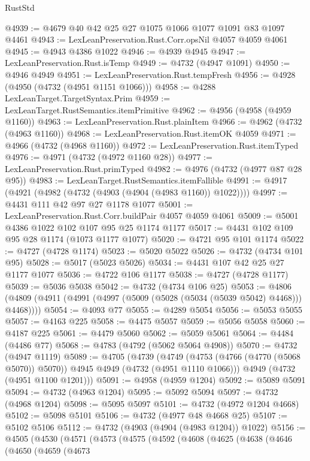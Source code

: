 \begin{lexlean}{RustStd}
\begin{coremodule}
@4939 := @4679 @40 @42 @25 @27 @1075 @1066 @1077 @1091 @83 @1097 @4461
@4943 := LexLeanPreservation.Rust.Corr.opsNil @4057 @4059 @4061
@4945 := @4943 @4386 @1022
@4946 := @4939 @4945
@4947 := LexLeanPreservation.Rust.isTemp
@4949 := @4732 (@4947 @1091)
@4950 := @4946 @4949
@4951 := LexLeanPreservation.Rust.tempFresh
@4956 := @4928 (@4950 (@4732 (@4951 @1151 @1066)))
@4958 := @4288 LexLeanTarget.TargetSyntax.Prim
@4959 := LexLeanTarget.RustSemantics.itemPrimitive
@4962 := @4956 (@4958 (@4959 @1160))
@4963 := LexLeanPreservation.Rust.plainItem
@4966 := @4962 (@4732 (@4963 @1160))
@4968 := LexLeanPreservation.Rust.itemOK @4059
@4971 := @4966 (@4732 (@4968 @1160))
@4972 := LexLeanPreservation.Rust.itemTyped
@4976 := @4971 (@4732 (@4972 @1160 @28))
@4977 := LexLeanPreservation.Rust.primTyped
@4982 := @4976 (@4732 (@4977 @87 @28 @95))
@4983 := LexLeanTarget.RustSemantics.itemFallible
@4991 := @4917 (@4921 (@4982 (@4732 (@4903 (@4904 (@4983 @1160)) @1022))))
@4997 := @4431 @111 @42 @97 @27 @1178 @1077
@5001 := LexLeanPreservation.Rust.Corr.buildPair @4057 @4059 @4061
@5009 := @5001 @4386 @1022 @102 @107 @95 @25 @1174 @1177
@5017 := @4431 @102 @109 @95 @28 @1174 (@1073 @1177 @1077)
@5020 := @4721 @95 @101 @1174
@5022 := @4727 (@4728 @1174)
@5023 := @5020 @5022
@5026 := @4732 (@4734 @101 @95)
@5028 := @5017 (@5023 @5026)
@5034 := @4431 @107 @42 @25 @27 @1177 @1077
@5036 := @4722 @106 @1177
@5038 := @4727 (@4728 @1177)
@5039 := @5036 @5038
@5042 := @4732 (@4734 @106 @25)
@5053 := @4806 (@4809 (@4911 (@4991 (@4997 (@5009 (@5028 (@5034 (@5039 @5042) @4468))) @4468))))
@5054 := @4093 @77
@5055 := @4289 @5054
@5056 := @5053 @5055
@5057 := @4163 @225
@5058 := @4475 @5057
@5059 := @5056 @5058
@5060 := @4187 @225
@5061 := @4479 @5060
@5062 := @5059 @5061
@5064 := @4484 (@4486 @77)
@5068 := @4783 (@4792 (@5062 @5064 @4908))
@5070 := @4732 (@4947 @1119)
@5089 := @4705
    (@4739
      (@4749 (@4753 (@4766 (@4770 (@5068 @5070)) @5070)) @4945 @4949 (@4732 (@4951 @1110 @1066)))
      @4949
      (@4732 (@4951 @1100 @1201)))
@5091 := @4958 (@4959 @1204)
@5092 := @5089 @5091
@5094 := @4732 (@4963 @1204)
@5095 := @5092 @5094
@5097 := @4732 (@4968 @1204)
@5098 := @5095 @5097
@5101 := @4732 (@4972 @1204 @4668)
@5102 := @5098 @5101
@5106 := @4732 (@4977 @48 @4668 @25)
@5107 := @5102 @5106
@5112 := @4732 (@4903 (@4904 (@4983 @1204)) @1022)
@5156 := @4505
    (@4530
      (@4571
        (@4573
          (@4575
            (@4592
              (@4608
                (@4625
                  (@4638
                    (@4646
                      (@4650
                        (@4659
                          (@4673

\end{coremodule}
\end{lexlean}
